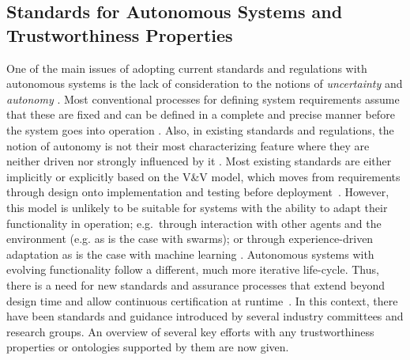 
\subsection{Standards for Autonomous Systems and Trustworthiness Properties} \label{sec:standards}
One of the main issues of adopting current standards and regulations with autonomous systems is the lack of consideration to the notions of \textit{uncertainty} and \textit{autonomy} \cite{Fisher2021}. 
%
Most conventional processes for defining system requirements assume that these are fixed and can be defined in a complete and precise manner before the system goes into operation \cite{Abeywickrama2022}. 
%
Also, in existing standards and regulations, the notion of autonomy is not their most characterizing feature where they are neither driven nor strongly influenced by it \cite{Fisher2021}. 
%
Most existing standards are either implicitly or explicitly based on the V\&V model, which moves from requirements through design onto implementation and testing before deployment~\cite{Jia2021}. 
%
However, this model is unlikely to be suitable for systems with the ability to adapt their functionality in operation; e.g.\ through interaction with other agents and the environment (e.g. as is the case with swarms); or through experience-driven adaptation as is the case with machine learning \cite{Abeywickrama2022}. 
%
%
Autonomous systems with evolving functionality follow a different, much more iterative life-cycle. Thus, there is a need for new standards and assurance processes that extend beyond design time and allow continuous certification at runtime~\cite{Rushby2008}. In this context, there have been standards and guidance introduced by several industry committees and research groups. An overview of several key efforts with any trustworthiness properties or ontologies supported by them are now given.

